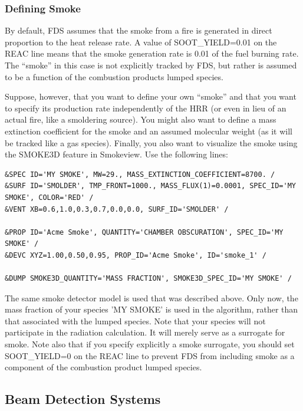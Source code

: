 \documentclass[11pt]{book}
\begin{document}
\subsubsection{Defining Smoke}
\label{info:alternative_smoke}

By default, FDS assumes that the smoke from a fire is generated in direct proportion to the heat release rate. A value of {\ct SOOT\_YIELD=0.01} on the {\ct REAC} line means that the smoke generation rate is 0.01 of the fuel burning rate. The ``smoke'' in this case is not explicitly tracked by FDS, but rather is assumed to be a function of the combustion products lumped species.

Suppose, however, that you want to define your own ``smoke'' and that you want to specify its production rate independently of the HRR (or even in lieu of an actual fire, like a smoldering source). You might also want to define a mass extinction coefficient for the smoke and an assumed molecular weight (as it will be tracked like a gas species). Finally, you also want to visualize the smoke using the {\ct SMOKE3D} feature in Smokeview. Use the following lines:
\begin{lstlisting}
&SPEC ID='MY SMOKE', MW=29., MASS_EXTINCTION_COEFFICIENT=8700. /
&SURF ID='SMOLDER', TMP_FRONT=1000., MASS_FLUX(1)=0.0001, SPEC_ID='MY SMOKE', COLOR='RED' /
&VENT XB=0.6,1.0,0.3,0.7,0.0,0.0, SURF_ID='SMOLDER' /

&PROP ID='Acme Smoke', QUANTITY='CHAMBER OBSCURATION', SPEC_ID='MY SMOKE' /
&DEVC XYZ=1.00,0.50,0.95, PROP_ID='Acme Smoke', ID='smoke_1' /

&DUMP SMOKE3D_QUANTITY='MASS FRACTION', SMOKE3D_SPEC_ID='MY SMOKE' /
\end{lstlisting}
The same smoke detector model is used that was described above. Only now, the mass fraction of your species {\ct 'MY SMOKE'} is used in the algorithm, rather than that associated with the lumped species. Note that your species will not participate in the radiation calculation. It will merely serve as a surrogate for smoke. Note also that if you specify explicitly a smoke surrogate, you should set {\ct SOOT\_YIELD=0} on the {\ct REAC} line to prevent FDS from including smoke as a component of the combustion product lumped species.



\subsection{Beam Detection Systems}
\label{info:beam_detector}
\end{document}
